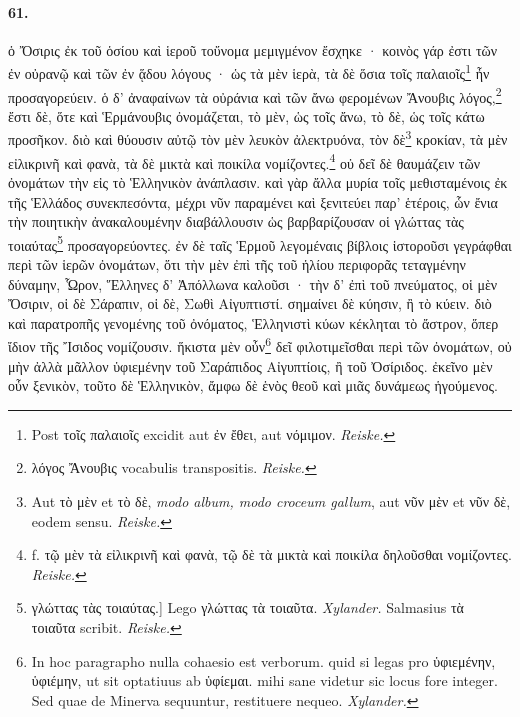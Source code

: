 \documentclass[a4paper, 11pt, oneside, polutonikogreek, german]{article}
\begin{document}
\paragraph{61.}
ὁ Ὄσιρις ἐκ τοῦ ὁσίου καὶ ἱεροῦ τοὔνομα μεμιγμένον ἔσχηκε · κοινὸς γάρ ἐστι τῶν ἐν οὐρανῷ καὶ τῶν ἐν ᾅδου λόγους · ὡς τὰ μὲν ἱερὰ, τὰ δὲ ὅσια τοῖς παλαιοῖς\footnote{Post τοῖς παλαιοῖς excidit aut ἐν ἔθει, aut νόμιμον. \emph{Reiske.}} ἦν προσαγορεύειν. ὁ δ' ἀναφαίνων τὰ οὐράνια καὶ τῶν ἄνω φερομένων Ἄνουβις λόγος,\footnote{λόγος Ἄνουβις vocabulis transpositis. \emph{Reiske.}} ἔστι δὲ, ὅτε καὶ Ἑρμάνουβις ὀνομάζεται, τὸ μὲν, ὡς τοῖς ἄνω, τὸ δὲ, ὡς τοῖς κάτω προσῆκον. διὸ καὶ θύουσιν αὐτῷ τὸν μὲν λευκὸν ἀλεκτρυόνα, τὸν δὲ\footnote{Aut τὸ μὲν et τὸ δὲ, \emph{modo album, modo croceum gallum}, aut νῦν μὲν et νῦν δὲ, eodem sensu. \emph{Reiske.}} κροκίαν, τὰ μὲν εἰλικρινῆ καὶ φανὰ, τὰ δὲ μικτὰ καὶ ποικίλα νομίζοντες.\footnote{f. τῷ μὲν τὰ εἰλικρινῆ καὶ φανὰ, τῷ δὲ τὰ μικτὰ καὶ ποικίλα δηλοῦσθαι νομίζοντες. \emph{Reiske.}} οὐ δεῖ δὲ θαυμάζειν τῶν ὀνομάτων τὴν εἰς τὸ Ἑλληνικὸν ἀνάπλασιν. καὶ γὰρ ἄλλα μυρία τοῖς μεθισταμένοις ἐκ τῆς Ἑλλάδος συνεκπεσόντα, μέχρι νῦν παραμένει καὶ ξενιτεύει παρ' ἑτέροις, ὧν ἔνια τὴν ποιητικὴν ἀνακαλουμένην διαβάλλουσιν ὡς βαρβαρίζουσαν οἱ γλώττας τὰς τοιαύτας\footnote{γλώττας τὰς τοιαύτας.] Lego γλώττας τὰ τοιαῦτα. \emph{Xylander.} Salmasius τὰ τοιαῦτα scribit. \emph{Reiske.}} προσαγορεύοντες. ἐν δὲ ταῖς Ἑρμοῦ λεγομέναις βίβλοις ἱστοροῦσι γεγράφθαι περὶ τῶν ἱερῶν ὀνομάτων, ὅτι τὴν μὲν ἐπὶ τῆς τοῦ ἡλίου περιφορᾶς τεταγμένην δύναμην, Ὧρον, Ἕλληνες δ' Ἀπόλλωνα καλοῦσι · τὴν δ' ἐπὶ τοῦ πνεύματος, οἱ μὲν Ὄσιριν, οἱ δὲ Σάραπιν, οἱ δὲ, Σωθὶ Αἰγυπτιστί. σημαίνει δὲ κύησιν, ἢ τὸ κύειν. διὸ καὶ παρατροπῆς γενομένης τοῦ ὀνόματος, Ἑλληνιστὶ κύων κέκληται τὸ ἄστρον, ὅπερ ἴδιον τῆς Ἴσιδος νομίζουσιν. ἥκιστα μὲν οὖν\footnote{In hoc paragrapho nulla cohaesio est verborum. quid si legas pro ὑφιεμένην, ὑφιέμην, ut sit optatiuus ab ὑφίεμαι. mihi sane videtur sic locus fore integer. Sed quae de Minerva sequuntur, restituere nequeo. \emph{Xylander.}} δεῖ φιλοτιμεῖσθαι περὶ τῶν ὀνομάτων, οὐ μὴν ἀλλὰ μᾶλλον ὑφιεμένην τοῦ Σαράπιδος Αἰγυπτίοις, ἢ τοῦ Ὀσίριδος. ἐκεῖνο μὲν οὖν ξενικὸν, τοῦτο δὲ Ἑλληνικὸν, ἄμφω δὲ ἑνὸς θεοῦ καὶ μιᾶς δυνάμεως ἡγούμενος.
\end{document}
